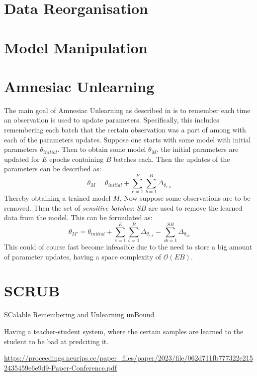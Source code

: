 \section{Data Reorganisation}






\section{Model Manipulation}






\section{Amnesiac Unlearning}

The main goal of Amnesiac Unlearning as described in \cite{graves_amnesiac_2020} is to remember each time an observation is used to update parameters. Specifically, this includes remembering each batch that the certain observation was a part of among with each of the parameters updates. Suppose one starts with some  model with initial parameters $\theta_{initial}$. Then to obtain some model $\theta_{M}$, the initial parameters are updated for $E$ epochs containing $B$ batches each. Then the updates of the parameters can be described as:
\[
    \theta_M = \theta_{initial} + \sum^E_{e=1} \sum^B_{b=1} \Delta_{\theta_{e,b}}
\]
Thereby obtaining a trained model $M$. Now suppose some observations are to be removed. Then the set of \textit{sensitive batches}: $SB$ are used to remove the learned data from the model. This can be formulated as:
\[
    \theta_{M'} = \theta_{initial} + \sum^E_{e=1} \sum^B_{b=1} \Delta_{\theta_{e,b}} - \sum_{sb=1}^{SB} \Delta_{\theta_{sb}}
\]
This could of course fast become infeasible due to the need to store a big amount of parameter updates, having a space complexity of $\mathcal{O}(EB)$.




\section{SCRUB}
SCalable Remembering and Unlearning unBound



Having a teacher-student system, where the certain samples are learned to the student to be bad at predciting it. 

\url{https://proceedings.neurips.cc/paper_files/paper/2023/file/062d711fb777322e2152435459e6e9d9-Paper-Conference.pdf}




